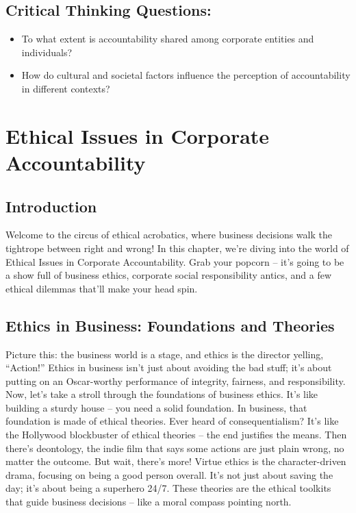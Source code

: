 \documentclass[
  letterpaper,
  DIV=11,
  numbers=noendperiod]{scrreprt}
\begin{document}
\subsection{Critical Thinking
Questions:}\label{critical-thinking-questions-1}

\begin{itemize}
\item
  To what extent is accountability shared among corporate entities and
  individuals?
\item
  How do cultural and societal factors influence the perception of
  accountability in different contexts?
\end{itemize}

\section{Ethical Issues in Corporate
Accountability}\label{ethical-issues-in-corporate-accountability}

\subsection{Introduction}\label{introduction-3}

Welcome to the circus of ethical acrobatics, where business decisions
walk the tightrope between right and wrong! In this chapter, we're
diving into the world of Ethical Issues in Corporate Accountability.
Grab your popcorn -- it's going to be a show full of business ethics,
corporate social responsibility antics, and a few ethical dilemmas
that'll make your head spin.

\subsection{Ethics in Business: Foundations and
Theories}\label{ethics-in-business-foundations-and-theories}

Picture this: the business world is a stage, and ethics is the director
yelling, ``Action!'' Ethics in business isn't just about avoiding the
bad stuff; it's about putting on an Oscar-worthy performance of
integrity, fairness, and responsibility. Now, let's take a stroll
through the foundations of business ethics. It's like building a sturdy
house -- you need a solid foundation. In business, that foundation is
made of ethical theories. Ever heard of consequentialism? It's like the
Hollywood blockbuster of ethical theories -- the end justifies the
means. Then there's deontology, the indie film that says some actions
are just plain wrong, no matter the outcome. But wait, there's more!
Virtue ethics is the character-driven drama, focusing on being a good
person overall. It's not just about saving the day; it's about being a
superhero 24/7. These theories are the ethical toolkits that guide
business decisions -- like a moral compass pointing north.
\end{document}
